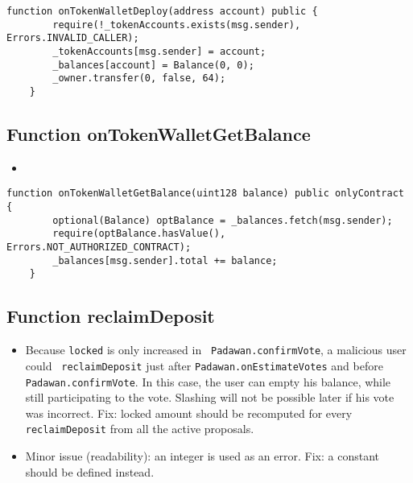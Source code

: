 \begin{lstlisting}[firstnumber=237]
    function onTokenWalletDeploy(address account) public {
        require(!_tokenAccounts.exists(msg.sender), Errors.INVALID_CALLER);
        _tokenAccounts[msg.sender] = account;
        _balances[account] = Balance(0, 0);
        _owner.transfer(0, false, 64);
    }
\end{lstlisting}

\subsection{Function onTokenWalletGetBalance}

\begin{itemize}
\item {}
\end{itemize}

\begin{lstlisting}[firstnumber=222]
    function onTokenWalletGetBalance(uint128 balance) public onlyContract {
        optional(Balance) optBalance = _balances.fetch(msg.sender);
        require(optBalance.hasValue(), Errors.NOT_AUTHORIZED_CONTRACT);
        _balances[msg.sender].total += balance;
    }
\end{lstlisting}

\subsection{Function reclaimDeposit}

\begin{itemize}
\item {}
  {Because {\tt locked} is only increased in {\tt
      Padawan.confirmVote}, a malicious user could {\tt
      reclaimDeposit} just after {\tt Padawan.onEstimateVotes} and
    before {\tt Padawan.confirmVote}. In this case, the user can empty
    his balance, while still participating to the vote. Slashing will
    not be possible later if his vote was incorrect. Fix: locked
    amount should be recomputed for every {\tt reclaimDeposit} from
    all the active proposals.}

\item Minor issue (readability): an integer is used as an error. Fix:
  a constant should be defined instead.
\end{itemize}

